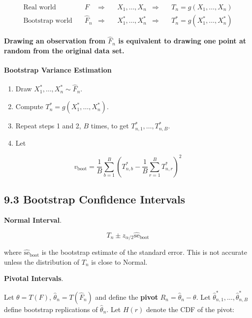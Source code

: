 \begin{align}
\text{Real world} \quad      & F         & \Longrightarrow\quad & X_1, \dots, X_n        & \Longrightarrow & \quad T_n = g(X_1, \dots, X_n) \\
\text{Bootstrap world} \quad & \hat{F}_n & \Longrightarrow\quad  & X_1^*, \dots, X_n^* & \Longrightarrow & \quad T_n^* = g(X_1^*, \dots, X_n^*)
\end{align}

\textbf{Drawing an observation from \(\hat{F}_n\) is equivalent to
drawing one point at random from the original data set.}

\paragraph{Bootstrap Variance
Estimation}\label{bootstrap-variance-estimation}

\begin{enumerate}[tightlist,label={\arabic*.}]
\item
  Draw \(X_1^*, \dots, X_n^* \sim \hat{F}_n\).
\item
  Compute \(T_n^* = g(X_1^*, \dots, X_n^*)\).
\item
  Repeat steps 1 and 2, \(B\) times, to get
  \(T_{n, 1}^*, \dots, T_{n, B}^*\).
\item
  Let
\end{enumerate}

\[ v_{\text{boot}} = \frac{1}{B} \sum_{b=1}^B \left( T_{n, b}^* - \frac{1}{B} \sum_{r=1}^B T_{n, r}^* \right)^2 \]

\subsection{9.3 Bootstrap Confidence
Intervals}\label{bootstrap-confidence-intervals}

\textbf{Normal Interval}.

\[ T_n \pm z_{\alpha/2} \hat{\text{se}}_\text{boot} \]

where \(\hat{\text{se}}_\text{boot}\) is the bootstrap estimate of the
standard error. This is not accurate unless the distribution of \(T_n\)
is close to Normal.

\textbf{Pivotal Intervals}.

Let \(\theta = T(F)\), \(\hat{\theta}_n = T(\hat{F}_n)\) and define the
\textbf{pivot} \(R_n = \hat{\theta}_n  - \theta\). Let
\(\hat{\theta}_{n, 1}^*, \dots, \hat{\theta}_{n, B}^*\) define bootstrap
replications of \(\hat{\theta}_n\). Let \(H(r)\) denote the CDF of the
pivot:

